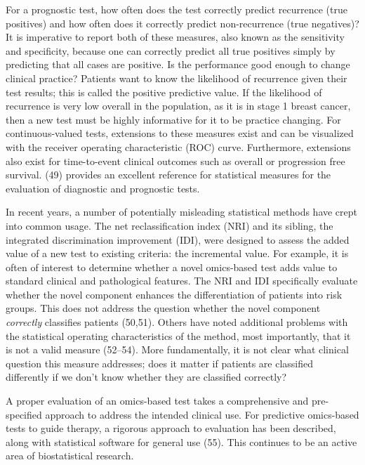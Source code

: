 \documentclass[11pt]{article}
\begin{document}
For a prognostic test, how often does the test correctly predict
recurrence (true positives) and how often does it correctly predict
non-recurrence (true negatives)? It is imperative to report both of
these measures, also known as the sensitivity and specificity, because
one can correctly predict all true positives simply by predicting that
all cases are positive. Is the performance good enough to change
clinical practice? Patients want to know the likelihood of recurrence
given their test results; this is called the positive predictive value.
If the likelihood of recurrence is very low overall in the population,
as it is in stage 1 breast cancer, then a new test must be highly
informative for it to be practice changing. For continuous-valued tests,
extensions to these measures exist and can be visualized with the
receiver operating characteristic (ROC) curve. Furthermore, extensions
also exist for time-to-event clinical outcomes such as overall or
progression free survival. (49) provides an excellent reference for
statistical measures for the evaluation of diagnostic and prognostic
tests.

In recent years, a number of potentially misleading statistical methods
have crept into common usage. The net reclassification index (NRI) and
its sibling, the integrated discrimination improvement (IDI), were
designed to assess the added value of a new test to existing criteria:
the incremental value. For example, it is often of interest to determine
whether a novel omics-based test adds value to standard clinical and
pathological features. The NRI and IDI specifically evaluate whether the
novel component enhances the differentiation of patients into risk
groups. This does not address the question whether the novel component
\emph{correctly} classifies patients (50,51). Others have noted
additional problems with the statistical operating characteristics of
the method, most importantly, that it is not a valid measure (52--54).
More fundamentally, it is not clear what clinical question this measure
addresses; does it matter if patients are classified differently if we
don't know whether they are classified correctly?

A proper evaluation of an omics-based test takes a comprehensive and
pre-specified approach to address the intended clinical use. For
predictive omics-based tests to guide therapy, a rigorous approach to
evaluation has been described, along with statistical software for
general use (55). This continues to be an active area of biostatistical
research.
\end{document}
